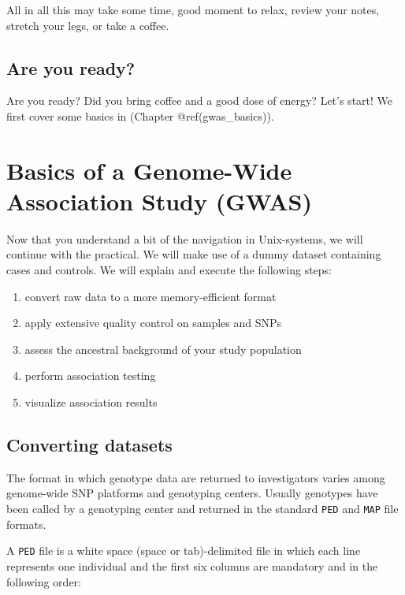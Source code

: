 \documentclass[
]{book}
\providecommand{\tightlist}{%
  \setlength{\itemsep}{0pt}\setlength{\parskip}{0pt}}
\begin{document}
All in all this may take some time, good moment to relax, review your notes, stretch your legs, or take a coffee.

\hypertarget{are-you-ready}{%
\section{Are you ready?}\label{are-you-ready}}

Are you ready? Did you bring coffee and a good dose of energy? Let's start! We first cover some basics in (Chapter @ref(gwas\_basics)).

\hypertarget{basics-of-a-genome-wide-association-study-gwas}{%
\chapter{Basics of a Genome-Wide Association Study (GWAS)}\label{basics-of-a-genome-wide-association-study-gwas}}

Now that you understand a bit of the navigation in Unix-systems, we will continue with the practical. We will make use of a dummy dataset containing cases and controls. We will explain and execute the following steps:

\begin{enumerate}
\def\labelenumi{\arabic{enumi}.}
\tightlist
\item
  convert raw data to a more memory-efficient format
\item
  apply extensive quality control on samples and SNPs
\item
  assess the ancestral background of your study population
\item
  perform association testing
\item
  visualize association results
\end{enumerate}

\hypertarget{converting-datasets}{%
\section{Converting datasets}\label{converting-datasets}}

The format in which genotype data are returned to investigators varies among genome-wide SNP platforms and genotyping centers. Usually genotypes have been called by a genotyping center and returned in the standard \texttt{PED} and \texttt{MAP} file formats.

A \texttt{PED} file is a white space (space or tab)-delimited file in which each line represents one individual and the first six columns are mandatory and in the following order:
\end{document}
